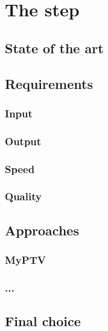\chapter{The \match* step}
\label{chap:matching}

\section{State of the art}
\section{Requirements}

\subsection{Input}
\subsection{Output}
\subsection{Speed}
\subsection{Quality}
\section{Approaches}
\subsection{MyPTV}
\subsection{...}
\section{Final choice}
